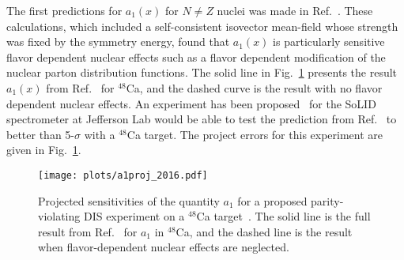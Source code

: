 The first predictions for $a_1(x)$ for $N \neq Z$ nuclei was made in Ref.~\cite{Cloet:2012td}. These calculations, which included a self-consistent isovector mean-field whose strength was fixed by the symmetry energy, found that $a_1(x)$ is particularly sensitive flavor dependent nuclear effects such as a flavor dependent modification of the nuclear parton distribution functions. The solid line in Fig.~\ref{fig:ivemc:pvdis} presents the result $a_1(x)$ from Ref.~\cite{Cloet:2012td} for ${}^{48}$Ca, and the dashed curve is the result with no flavor dependent nuclear effects. An experiment has been proposed~\cite{emcpvdis} for the SoLID spectrometer at Jefferson Lab would be able to test the prediction from Ref.~\cite{Cloet:2012td} to better than 5-$\sigma$ with a ${}^{48}$Ca target. The project errors for this experiment are given in Fig.~\ref{fig:ivemc:pvdis}.

\begin{figure}[tbp]
\centering\texttt{[image: plots/a1proj\_2016.pdf]}
\caption{Projected sensitivities of the quantity $a_1$ for a proposed parity-violating DIS experiment on a ${}^{48}$Ca target~\cite{emcpvdis}. The solid line is the full result from Ref.~\cite{Cloet:2012td} for $a_1$ in ${}^{48}$Ca, and the dashed line is the result when flavor-dependent nuclear effects are neglected.}
\label{fig:ivemc:pvdis}
\end{figure}





